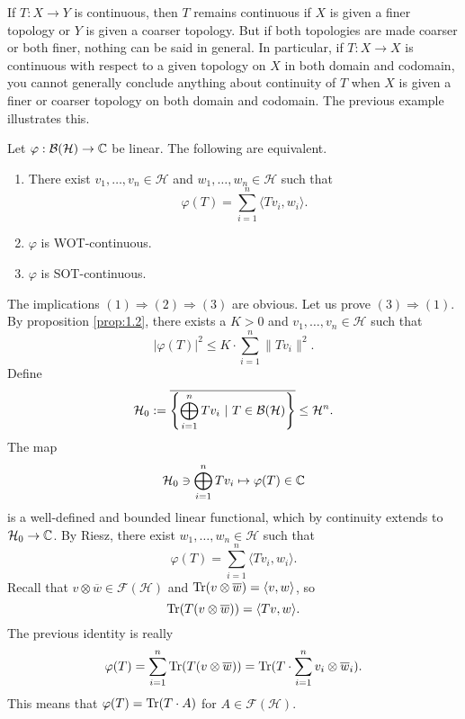 \begin{remark}
  If $T:X\to Y$ is continuous, then $T$ remains continuous if $X$ is given a finer topology or $Y$ is given a coarser topology. 
  But if both topologies are made coarser or both finer, nothing can be said in general. In particular, if $T:X\to X$ is 
  continuous with respect to a given topology on $X$ in both domain and codomain, you cannot generally conclude anything 
  about continuity of $T$ when $X$ is given a finer or coarser topology on both domain and codomain. The previous example illustrates this.
\end{remark}

\begin{lemma}
  Let $\varphi: \operatorname{\mathcal{B} (\mathcal{H})} \to \mathbb {C}$ be linear. The following are equivalent.
  \begin{enumerate}
    \item There exist $v_1, \dots, v_n \in \mathcal{H}$ and $w_1, \dots, w_n \in \mathcal{H}$ such that 
    $$\varphi (T) = \sum_{i = 1} ^n \langle T v_i, w_i \rangle.$$
    \item $\varphi$ is WOT-continuous.
    \item $\varphi$ is SOT-continuous.
  \end{enumerate}
\end{lemma}

\begin{myproof}
  The implications $(1) \Rightarrow (2) \Rightarrow (3)$ are obvious. Let us prove $(3) \Rightarrow (1)$.
  By proposition \ref{prop:1.2}, there exists a $K > 0$ and $v_1, \dots, v_n \in \mathcal{H}$
  such that 
  $$|\varphi(T)|^2 \leq K \cdot \sum_{i = 1} ^n \| Tv_i\|^2.$$
  Define $$\mathcal{H}_0 := \overline{\left\lbrace \bigoplus_{i = 1} ^n Tv_i\ |\ T \in \operatorname{\mathcal{B} (\mathcal{H})} \right\rbrace} \leq \mathcal{H} ^{n}.$$
  The map 
  $$\mathcal{H}_0 \ni \bigoplus_{i = 1} ^n T v_i \mapsto \varphi(T) \in \mathbb {C}$$
  is a well-defined and bounded linear functional, which by continuity extends to $\mathcal{H}_0 \to \mathbb {C}$.
  By Riesz, there exist $w_1, \dots, w_n \in \mathcal{H}$ such that 
  $$\varphi(T) = \sum_{i = 1} ^n \langle T v_i, w_i \rangle.$$
  Recall that $v \otimes \overline{w} \in \mathcal{F} (\mathcal{H})$ and $\operatorname{Tr} (v \otimes \overline{w}) = \langle v, w \rangle$, so 
  $$\operatorname{Tr} (T (v \otimes \overline{w})) = \langle Tv, w \rangle.$$
  The previous identity is really 
  $$\varphi(T) = \sum_{i = 1} ^n \operatorname{Tr} (T (v \otimes \overline{w})) = \operatorname{Tr} (T \cdot \sum_{i = 1} ^n v_i \otimes \overline{w}_i).$$
  This means that $\varphi(T) = \operatorname{Tr} (T \cdot A)$ for $A \in \mathcal{F} (\mathcal{H})$.
\end{myproof}

